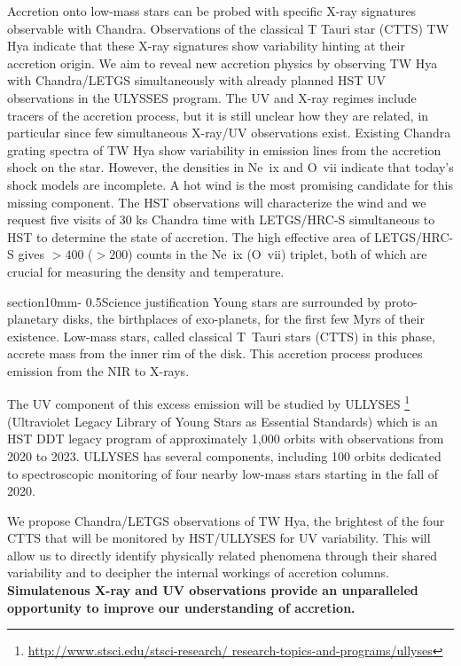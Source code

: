 \documentclass[letterpaper,11pt,twocolumn]{article}
\makeatletter
\renewcommand{\section}{\@startsection%
{section}{1}{0mm}{-\baselineskip}%
{0.5\baselineskip}{\normalfont\Large\bfseries}}%
\makeatother
\begin{document}
Accretion onto low-mass stars can be probed with specific X-ray
signatures observable with Chandra. Observations of the
classical T Tauri star (CTTS) TW Hya indicate that these X-ray
signatures show variability hinting at their accretion origin. We aim
to reveal new accretion physics by observing TW Hya with Chandra/LETGS
simultaneously with already planned HST UV observations in the ULYSSES
program.
The UV and X-ray regimes include tracers of the
accretion process, but it is still unclear how they are related, in
particular since few simultaneous X-ray/UV observations
exist. Existing Chandra grating spectra of TW Hya show variability in emission
lines from the accretion shock on the star. However, the densities in
Ne~{\sc ix} and O~{\sc vii} indicate that today's shock models are
incomplete. A hot wind is the most promising candidate for this
missing component. The HST observations will characterize the wind and
we request five visits of 30 ks Chandra time with LETGS/HRC-S
simultaneous to HST to determine the state of accretion. The high
effective area of LETGS/HRC-S gives $> 400$ ($>200$) counts in the Ne~{\sc ix} (O~{\sc vii}) triplet, both of which are
crucial for measuring the density and temperature.


\section{Science justification}
Young stars are surrounded by proto-planetary disks, the birthplaces of exo-planets, for the first few Myrs of their existence. Low-mass stars, called classical T~Tauri stars (CTTS) in this phase, accrete mass from the inner rim of the disk. This accretion process produces emission from the NIR to X-rays.

The UV component of this excess emission will be studied by ULLYSES 
\footnote{\url{http://www.stsci.edu/stsci-research/ research-topics-and-programs/ullyses}}
(Ultraviolet Legacy Library of Young Stars as Essential Standards) which is an HST DDT legacy program of  approximately 1,000 orbits with observations from 2020 to 2023. ULLYSES has several components, including 100 orbits dedicated to spectroscopic monitoring of four nearby low-mass stars  starting in the fall of 2020.

We propose Chandra/LETGS observations of TW Hya, the brightest of the four  CTTS that will be monitored by HST/ULLYSES for UV variability.
This will allow us to directly identify physically related phenomena through
their shared variability and to decipher the internal workings of accretion columns.  {\bf Simulatenous X-ray and UV
observations provide an unparalleled opportunity to improve
our understanding of accretion.}
\end{document}
